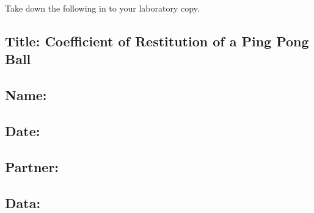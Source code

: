 \documentclass[
  letterpaper,
  DIV=11,
  numbers=noendperiod]{scrreprt}
\begin{document}
Take down the following in to your laboratory copy.

\subsection*{\texorpdfstring{{Title: Coefficient of Restitution of a
Ping Pong
Ball}}{Title: Coefficient of Restitution of a Ping Pong Ball}}\label{title-coefficient-of-restitution-of-a-ping-pong-ball}

\subsection*{\texorpdfstring{{Name:}}{Name:}}\label{name-5}

\subsection*{\texorpdfstring{{Date:}}{Date:}}\label{date-5}

\subsection*{\texorpdfstring{{Partner:}}{Partner:}}\label{partner-5}

\subsection*{\texorpdfstring{{Data:}}{Data:}}\label{data-5}
\end{document}
